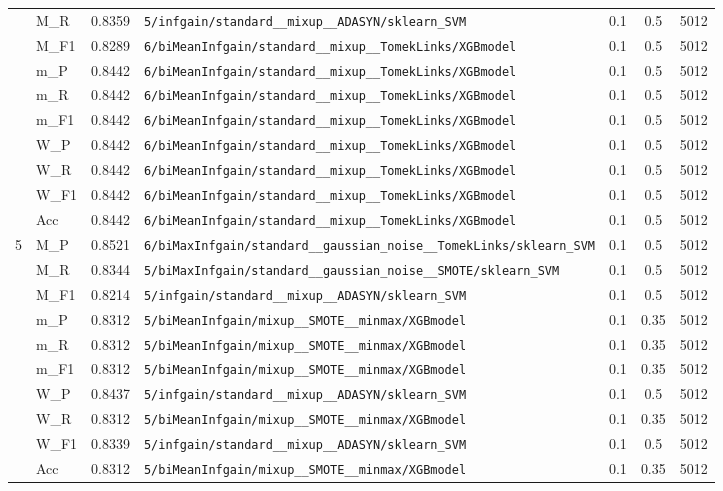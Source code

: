 \begin{table}[htbp]
\begin{tabular}{|c|l|c|>{\ttfamily\footnotesize}p{7.2cm}|c|c|c|}
 & M\_R & 0.8359 & \texttt{5/infgain/standard\_\_mixup\_\_ADASYN/sklearn\_SVM} & 0.1 & 0.5  & 5012 \\ 
 & M\_F1 & 0.8289 & \texttt{6/biMeanInfgain/standard\_\_mixup\_\_TomekLinks/XGBmodel} & 0.1 & 0.5  & 5012 \\ 
 & m\_P & 0.8442 & \texttt{6/biMeanInfgain/standard\_\_mixup\_\_TomekLinks/XGBmodel} & 0.1 & 0.5  & 5012 \\ 
 & m\_R & 0.8442 & \texttt{6/biMeanInfgain/standard\_\_mixup\_\_TomekLinks/XGBmodel} & 0.1 & 0.5  & 5012 \\ 
 & m\_F1 & 0.8442 & \texttt{6/biMeanInfgain/standard\_\_mixup\_\_TomekLinks/XGBmodel} & 0.1 & 0.5  & 5012 \\ 
 & W\_P & 0.8442 & \texttt{6/biMeanInfgain/standard\_\_mixup\_\_TomekLinks/XGBmodel} & 0.1 & 0.5  & 5012 \\ 
 & W\_R & 0.8442 & \texttt{6/biMeanInfgain/standard\_\_mixup\_\_TomekLinks/XGBmodel} & 0.1 & 0.5  & 5012 \\ 
 & W\_F1 & 0.8442 & \texttt{6/biMeanInfgain/standard\_\_mixup\_\_TomekLinks/XGBmodel} & 0.1 & 0.5  & 5012 \\ 
 & Acc & 0.8442 & \texttt{6/biMeanInfgain/standard\_\_mixup\_\_TomekLinks/XGBmodel} & 0.1 & 0.5  & 5012 \\ 
\hline
\multirow{10}{*}{5} & M\_P & 0.8521 & \texttt{6/biMaxInfgain/standard\_\_gaussian\_noise\_\_TomekLinks/sklearn\_SVM} & 0.1 & 0.5  & 5012 \\ 
 & M\_R & 0.8344 & \texttt{5/biMaxInfgain/standard\_\_gaussian\_noise\_\_SMOTE/sklearn\_SVM} & 0.1 & 0.5  & 5012 \\ 
 & M\_F1 & 0.8214 & \texttt{5/infgain/standard\_\_mixup\_\_ADASYN/sklearn\_SVM} & 0.1 & 0.5  & 5012 \\ 
 & m\_P & 0.8312 & \texttt{5/biMeanInfgain/mixup\_\_SMOTE\_\_minmax/XGBmodel} & 0.1 & 0.35  & 5012 \\ 
 & m\_R & 0.8312 & \texttt{5/biMeanInfgain/mixup\_\_SMOTE\_\_minmax/XGBmodel} & 0.1 & 0.35  & 5012 \\ 
 & m\_F1 & 0.8312 & \texttt{5/biMeanInfgain/mixup\_\_SMOTE\_\_minmax/XGBmodel} & 0.1 & 0.35  & 5012 \\ 
 & W\_P & 0.8437 & \texttt{5/infgain/standard\_\_mixup\_\_ADASYN/sklearn\_SVM} & 0.1 & 0.5  & 5012 \\ 
 & W\_R & 0.8312 & \texttt{5/biMeanInfgain/mixup\_\_SMOTE\_\_minmax/XGBmodel} & 0.1 & 0.35  & 5012 \\ 
 & W\_F1 & 0.8339 & \texttt{5/infgain/standard\_\_mixup\_\_ADASYN/sklearn\_SVM} & 0.1 & 0.5  & 5012 \\ 
 & Acc & 0.8312 & \texttt{5/biMeanInfgain/mixup\_\_SMOTE\_\_minmax/XGBmodel} & 0.1 & 0.35  & 5012 \\ 
\hline
\end{tabular}
\end{table}